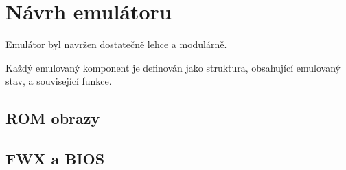 \chapter{Návrh emulátoru}


Emulátor byl navržen dostatečně lehce a modulárně.

Každý emulovaný komponent je definován jako struktura, obsahující emulovaný stav, a související
funkce.

\section{ROM obrazy}

\section{FWX a BIOS}
